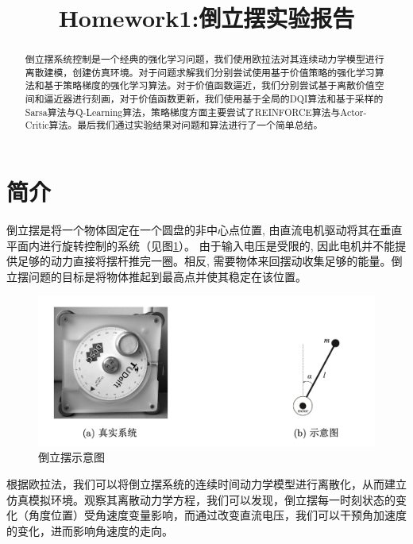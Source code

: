 \documentclass[conference,10pt]{IEEEtran}
\begin{document}
\title{Homework1:倒立摆实验报告\\}

\author{
}

\maketitle

\begin{abstract}
倒立摆系统控制是一个经典的强化学习问题，我们使用欧拉法对其连续动力学模型进行离散建模，创建仿真环境。对于问题求解我们分别尝试使用基于价值策略的强化学习算法和基于策略梯度的强化学习算法。对于价值函数逼近，我们分别尝试基于离散价值空间和逼近器进行刻画，对于价值函数更新，我们使用基于全局的DQI算法和基于采样的Sarsa算法与Q-Learning算法，策略梯度方面主要尝试了REINFORCE算法与Actor-Critic算法。最后我们通过实验结果对问题和算法进行了一个简单总结。
\end{abstract}
\section{简介}
倒立摆是将一个物体固定在一个圆盘的非中心点位置, 由直流电机驱动将其在垂直平面内进行旋转控制的系统（见图\ref{pic1}）。 由于输入电压是受限的, 因此电机并不能提供足够的动力直接将摆杆推完一圈。相反, 需要物体来回摆动收集足够的能量。倒立摆问题的目标是将物体推起到最高点并使其稳定在该位置。

\begin{figure}[H]
    \centering
    \includegraphics[scale=0.25]{./figure/pic1.png}
    \caption{倒立摆示意图}
    \label{pic1}
\end{figure}

根据欧拉法，我们可以将倒立摆系统的连续时间动力学模型进行离散化，从而建立仿真模拟环境。观察其离散动力学方程，我们可以发现，倒立摆每一时刻状态的变化（角度位置）受角速度变量影响，而通过改变直流电压，我们可以干预角加速度的变化，进而影响角速度的走向。
\end{document}
